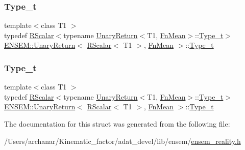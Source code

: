 \subsubsection{\texorpdfstring{Type\_t}{Type\_t}\hspace{0.1cm}{\footnotesize\ttfamily [1/2]}}
{\footnotesize\ttfamily template$<$class T1 $>$ \\
typedef \mbox{\hyperlink{classENSEM_1_1RScalar}{R\+Scalar}}$<$typename \mbox{\hyperlink{structENSEM_1_1UnaryReturn}{Unary\+Return}}$<$T1, \mbox{\hyperlink{structENSEM_1_1FnMean}{Fn\+Mean}}$>$\+::\mbox{\hyperlink{structENSEM_1_1UnaryReturn_3_01RScalar_3_01T1_01_4_00_01FnMean_01_4_a16f842b2df05b5909c08ddde22ca69f8}{Type\+\_\+t}}$>$ \mbox{\hyperlink{structENSEM_1_1UnaryReturn}{E\+N\+S\+E\+M\+::\+Unary\+Return}}$<$ \mbox{\hyperlink{classENSEM_1_1RScalar}{R\+Scalar}}$<$ T1 $>$, \mbox{\hyperlink{structENSEM_1_1FnMean}{Fn\+Mean}} $>$\+::\mbox{\hyperlink{structENSEM_1_1UnaryReturn_3_01RScalar_3_01T1_01_4_00_01FnMean_01_4_a16f842b2df05b5909c08ddde22ca69f8}{Type\+\_\+t}}}

\mbox{\label{structENSEM_1_1UnaryReturn_3_01RScalar_3_01T1_01_4_00_01FnMean_01_4_a16f842b2df05b5909c08ddde22ca69f8}} 
\subsubsection{\texorpdfstring{Type\_t}{Type\_t}\hspace{0.1cm}{\footnotesize\ttfamily [2/2]}}
{\footnotesize\ttfamily template$<$class T1 $>$ \\
typedef \mbox{\hyperlink{classENSEM_1_1RScalar}{R\+Scalar}}$<$typename \mbox{\hyperlink{structENSEM_1_1UnaryReturn}{Unary\+Return}}$<$T1, \mbox{\hyperlink{structENSEM_1_1FnMean}{Fn\+Mean}}$>$\+::\mbox{\hyperlink{structENSEM_1_1UnaryReturn_3_01RScalar_3_01T1_01_4_00_01FnMean_01_4_a16f842b2df05b5909c08ddde22ca69f8}{Type\+\_\+t}}$>$ \mbox{\hyperlink{structENSEM_1_1UnaryReturn}{E\+N\+S\+E\+M\+::\+Unary\+Return}}$<$ \mbox{\hyperlink{classENSEM_1_1RScalar}{R\+Scalar}}$<$ T1 $>$, \mbox{\hyperlink{structENSEM_1_1FnMean}{Fn\+Mean}} $>$\+::\mbox{\hyperlink{structENSEM_1_1UnaryReturn_3_01RScalar_3_01T1_01_4_00_01FnMean_01_4_a16f842b2df05b5909c08ddde22ca69f8}{Type\+\_\+t}}}



The documentation for this struct was generated from the following file\+:\begin{DoxyCompactItemize}
\item 
/\+Users/archanar/\+Kinematic\+\_\+factor/adat\+\_\+devel/lib/ensem/\mbox{\hyperlink{lib_2ensem_2ensem__reality_8h}{ensem\+\_\+reality.\+h}}\end{DoxyCompactItemize}

